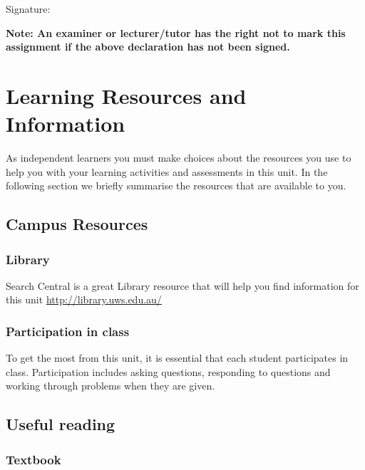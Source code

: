 \documentclass[a4paper,oneside]{book}
\begin{document}
\vspace{1em}
\noindent
Signature: \makebox[3in]{\hrulefill}

\vspace{1em}
\noindent
\textbf{Note: An examiner or lecturer/tutor has the right not to mark this
assignment if the above declaration has not been signed.}

\newpage

\chapter{Learning Resources and Information}

As independent learners you must make choices about the resources you
use to help you with your learning activities and assessments in this
unit.  In the following section we briefly summarise the resources
that are available to you.

\section{Campus Resources}


\subsection*{Library}
\label{sec:library}
Search Central is a great Library resource that will help you find
information for this unit \url{http://library.uws.edu.au/}



\subsection*{Participation in class}

To get the most from this unit, it is essential that each student
participates in class. Participation includes asking questions,
responding to questions and working through problems when they are
given.

\section{Useful reading}

\subsection*{Textbook}
\end{document}
